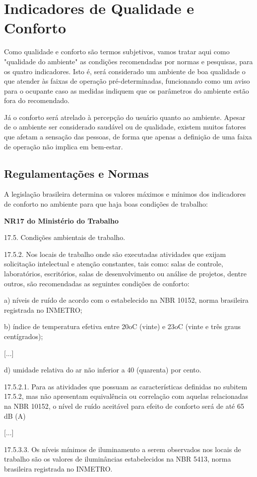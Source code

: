 \documentclass[monografia.tex]{subfiles}
\begin{document}
\section{Indicadores de Qualidade e Conforto} %


Como qualidade e conforto são termos subjetivos, vamos tratar aqui como "qualidade do ambiente" as condições recomendadas por normas e pesquisas, para os quatro indicadores. Isto é, será considerado um ambiente de boa qualidade o que atender às faixas de operação pré-determinadas, funcionando como um aviso para o ocupante caso as medidas indiquem que os parâmetros do ambiente estão fora do recomendado. 

Já o conforto será atrelado à percepção do usuário quanto ao ambiente. Apesar de o ambiente ser considerado saudável ou de qualidade, existem muitos fatores que afetam a sensação das pessoas, de forma que apenas a definição de uma faixa de operação não implica em bem-estar. 

\subsection{Regulamentações e Normas} %

A legislação brasileira determina os valores máximos e mínimos dos indicadores de conforto no ambiente para que haja boas condições de trabalho: 

\begin{citacaoLonga} %
\textbf{NR17 do Ministério do Trabalho} \cite{NR17}

17.5. Condições ambientais de trabalho.

17.5.2. Nos locais de trabalho onde são executadas atividades que exijam solicitação intelectual e atenção constantes, tais como: salas de controle, laboratórios, escritórios, salas de desenvolvimento ou análise de projetos, dentre outros, são recomendadas as seguintes condições de conforto:

a) níveis de ruído de acordo com o estabelecido na NBR 10152, norma brasileira registrada no INMETRO;

b) índice de temperatura efetiva entre 20oC (vinte) e 23oC (vinte e três graus centígrados);

[...]

d) umidade relativa do ar não inferior a 40 (quarenta) por cento.

17.5.2.1. Para as atividades que possuam as características definidas no subitem 17.5.2, mas não apresentam equivalência ou correlação com aquelas relacionadas na NBR 10152, o nível de ruído aceitável para efeito de conforto será de até 65 dB (A)

[...]

17.5.3.3. Os níveis mínimos de iluminamento a serem observados nos locais de trabalho são os valores de iluminâncias estabelecidos na NBR 5413, norma brasileira registrada no INMETRO.
\end{citacaoLonga}
\end{document}
